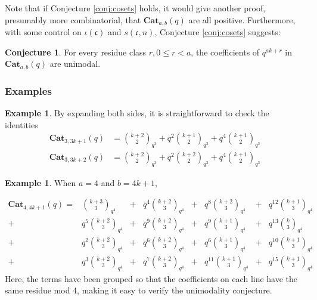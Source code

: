 \documentclass{amsart}[12pt]
\theoremstyle{definition}
\newtheorem{example}[dummy]{Example}
\newtheorem{conjecture}[dummy]{Conjecture}
\newcommand{\Cat}{\mathbf{Cat}}
\begin{document}
Note that if Conjecture \ref{conj:cosets} holds, it would give
another proof, presumably more combinatorial, that $\Cat_{a,b}(q)$ are all positive.  Furthermore, with some control on $\iota(\mathfrak{c})$ and $s(\mathfrak{c},n)$, Conjecture \ref{conj:cosets} suggests:

\begin{conjecture}
For every residue class $r, 0\leq r< a$, the coefficients of $q^{ak+r}$ in $\Cat_{a,b}(q)$ are unimodal.
\end{conjecture}

\subsubsection{Examples}

\begin{example}
By expanding both sides, it is straightforward to check the identities
\begin{align*}
\Cat_{3,3k+1}(q) & =\binom{k+2}{2}_{q^3}
+q^2\binom{k+1}{2}_{q^3}
+q^4\binom{k+1}{2}_{q^3} \\
\Cat_{3,3k+2}(q)&=
\binom{k+2}{2}_{q^3}
+q^2\binom{k+2}{2}_{q^3}
+q^4\binom{k+1}{2}_{q^3}
\end{align*}
\end{example}

\begin{example}
When $a=4$ and $b=4k+1$,

\begin{align*}
\Cat_{4, 4k+1}(q)=&
\binom{k+3}{3}_{q^4}&+&q^4\binom{k+2}{3}_{q^4}&+&q^8\binom{k+2}{3}_{q^4}&+&q^{12}\binom{k+1}{3}_{q^4} \\
+&q^5\binom{k+2}{3}_{q^4}&+&q^9\binom{k+2}{3}_{q^4}&+&q^9\binom{k+1}{3}_{q^4}&+&q^{13}\binom{k}{3}_{q^4} \\
+&q^2\binom{k+2}{3}_{q^4}&+&q^6\binom{k+2}{3}_{q^4}&+&q^6\binom{k+1}{3}_{q^4}&+&q^{10}\binom{k+1}{3}_{q^4}\\
+&q^3\binom{k+2}{3}_{q^4}&+&q^7\binom{k+2}{3}_{q^4}&+&q^{11}\binom{k+1}{3}_{q^4}&+&q^{15}\binom{k+1}{3}_{q^4}
\end{align*}
Here, the terms have been grouped so that the coefficients on each line have the same residue mod 4, making it easy to verify the unimodality conjecture.







\end{example}
\end{document}
